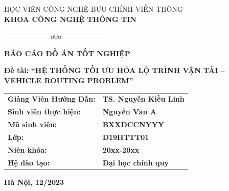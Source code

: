 \documentclass[12pt,a4paper,openany,oneside]{report}
\begin{document}
\pagestyle{fancy}
\fancyhf{}
\renewcommand{\headrulewidth}{0.4pt}
\renewcommand{\footrulewidth}{0.4pt}


\setlength{\fboxrule}{1.5pt}
\thisfancypage{\setlength{\fboxsep}{10pt}\setlength{\shadowsize}{0pt}\doublebox}{}

\begin{titlepage}
\fontsize{14pt}{14pt}\selectfont \baselineskip 0.65cm
\thispagestyle{empty}
\begin{center}
{HỌC VIỆN CÔNG NGHỆ BƯU CHÍNH VIỄN THÔNG}\\
\textbf{\MakeUppercase{KHOA CÔNG NGHỆ THÔNG TIN}}\\
\centerline{--------------------o0o--------------------}  
\end{center}

\vspace{0.5cm}
\begin{center}
\textbf{\MakeUppercase{\LARGE \bf BÁO CÁO ĐỒ ÁN TỐT NGHIỆP}}\\ 
\end{center} 

\vspace{1cm}
\begin{center}
\textbf{Đề tài:}
\textbf{\MakeUppercase{ \bf ``HỆ THỐNG TỐI ƯU HÓA LỘ TRÌNH VẬN TẢI -- VEHICLE ROUTING PROBLEM''}}\\ 
\end{center} 
\vspace{2cm}

\begin{tabular}{ll}
\textbf{\large{Giảng Viên Hướng Dẫn: }} & \textbf{\large{TS. Nguyễn Kiều Linh}} \\
\textbf{\large{Sinh viên thực hiện:}}}  & \textbf{\large{Nguyễn Văn A}} \\
\textbf{\large{Mã sinh viên: }}}  & \textbf{\large{BXXDCCNYYY}} \\
\textbf{\large{Lớp:}}}   & \textbf{\large{D19HTTT01}}\\
\textbf{\large{Niên khóa:}}}   & \textbf{\large{20xx-20xx}}\\
\textbf{\large{Hệ đào tạo:}}}   & \textbf{\large{Đại học chính quy}}
\end{tabular}

\vfill
\begin{center}
{{\bf Hà Nội, 12/2023}}
\end{center}
\end{titlepage}
\end{document}

